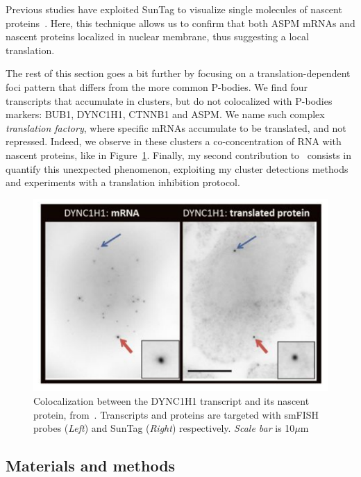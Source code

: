 Previous studies have exploited SunTag to visualize single molecules of nascent proteins~\cite{pichon_visualization_2016, Pichon_2018, Wu_2016}.
Here, this technique allows us to confirm that both ASPM \ac{mRNA}s and nascent proteins localized in nuclear membrane, thus suggesting a local translation.

The rest of this section goes a bit further by focusing on a translation-dependent foci pattern that differs from the more common \ac{P-bodies}.
We find four transcripts that accumulate in clusters, but do not colocalized with \ac{P-bodies} markers: BUB1, DYNC1H1, CTNNB1 and ASPM.
We name such complex \emph{translation factory}, where specific \ac{mRNA}s accumulate to be translated, and not repressed.
Indeed, we observe in these clusters a co-concentration of \ac{RNA} with nascent proteins, like in Figure~\ref{fig:translation_factory}.
Finally, my second contribution to~\cite{CHOUAIB_2020} consists in quantify this unexpected phenomenon, exploiting my cluster detections methods and experiments with a translation inhibition protocol.

\begin{figure}[]
    \centering
    \includegraphics[width=\textwidth]{figures/chapter5/translation_factory}
    \caption[smFISH and SunTag images of DYNC1H1]{Colocalization between the DYNC1H1 transcript and its nascent protein, from~\cite{pichon_visualization_2016}.
	Transcripts and proteins are targeted with smFISH probes (\textit{Left}) and SunTag (\textit{Right}) respectively.
	\textit{Scale bar} is 10$\mu$m}
    \label{fig:translation_factory}
\end{figure}

\subsection{Materials and methods}
\label{subsec:materials_translation_factories}

